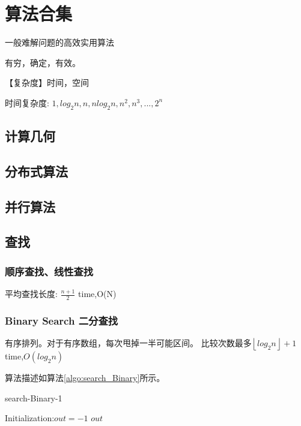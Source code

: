 \documentclass[UTF8]{../computerUniverse}
\begin{document}
\chapter{算法合集}
一般难解问题的高效实用算法

有穷，确定，有效。

【复杂度】时间，空间

时间复杂度: $1,log_2n,n,nlog_2n,n^2,n^3,...,2^n$




\section{计算几何}

\section{分布式算法}
\section{并行算法}





\section{查找}


\subsection{顺序查找、线性查找}
平均查找长度: $\frac{n+1}{2}$
time,O(N)


\subsection{Binary Search 二分查找}
有序排列。对于有序数组，每次甩掉一半可能区间。
比较次数最多$\left\lfloor log_2n\right\rfloor +1$
time,$O(log_2n)$


算法描述如算法\ref{algo:search_Binary}所示。

      \begin{algorithm}[h]%
        \caption{search-Binary-1}\label{algo:search_Binary_1}
        \SetAlgoLined
        \KwIn{ordered range set $S = [l,r)$, the search number $t$}
        Initialization:$out = -1$\;
        \KwRet $out$\;
      \end{algorithm}
\end{document}
